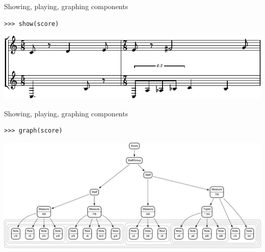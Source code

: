 \begin{frame}[fragile]{Showing, playing, graphing components}

\begin{abjadbookoutput}
\begin{singlespacing}
\vspace{-0.5\baselineskip}
\begin{verbatim}
>>> show(score)
\end{verbatim}
\noindent\includegraphics[max width=\textwidth,]{assets/lilypond-e3b1c40a4191d3949ecaa427d7f31b59.pdf}
\end{singlespacing}
\end{abjadbookoutput}

\end{frame}

\begin{frame}[fragile]{Showing, playing, graphing components}

\begin{abjadbookoutput}
\begin{singlespacing}
\vspace{-0.5\baselineskip}
\begin{verbatim}
>>> graph(score)
\end{verbatim}
\noindent\includegraphics[scale=0.4,max width=\textwidth,]{assets/graphviz-689ec46b64db8bb23aecc1c9990caba5.pdf}
\end{singlespacing}
\end{abjadbookoutput}

\end{frame}

